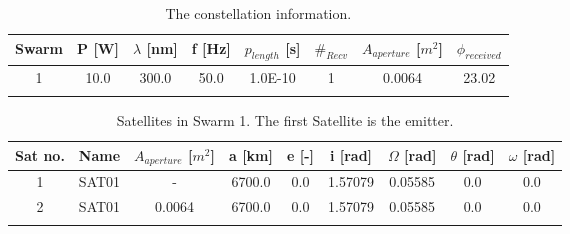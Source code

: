 \begin{center}
	\begin{longtable}{| c | c | c | c | c | c | c | c |}\hline
		\label{t:performance}
		Swarm & P [W] & $\lambda$ [nm] & f [Hz] & $p_{length}$ [s] & $\#_{Recv}$ & $A_{aperture}$ [$m^{2}$] & $\phi_{received}$ \\\hline
		1 & 10.0 & 300.0 & 50.0 & 1.0E-10 & 1 & 0.0064 & 23.02\\\hline
		\caption{The constellation information.}
	\end{longtable}
\end{center}

\begin{center}
	\begin{longtable}{| c | c | c | c | c | c | c | c | c |}\hline
		\label{t:performance}
		Sat no. & Name &$A_{aperture}$ [$m^{2}$] & a [km] & e [-] & i [rad] & $\Omega$ [rad] & $\theta$ [rad]& $\omega$ [rad] \\\hline
		1 & SAT01 & - & 6700.0 & 0.0 & 1.57079 & 0.05585 & 0.0 & 0.0\\\hline
		2 & SAT01 & 0.0064 & 6700.0 & 0.0 & 1.57079 & 0.05585 & 0.0 & 0.0\\\hline
		\caption{Satellites in Swarm 1. The first Satellite is the emitter.}
	\end{longtable}
\end{center}

